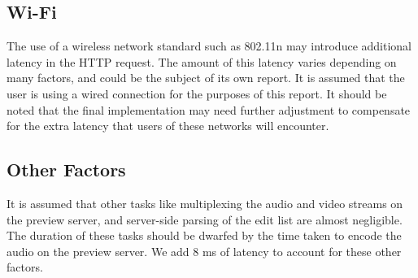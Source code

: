 \documentclass[se,resubmit]{uw-wkrpt}
\begin{document}
\begin{appendices}
\subsection{Wi-Fi}
The use of a wireless network standard such as 802.11n may introduce additional
latency in the HTTP request. The amount of this latency varies depending on many
factors, and could be the subject of its own report. It is assumed that the user
is using a wired connection for the purposes of this report. It should be noted
that the final implementation may need further adjustment to compensate for the
extra latency that users of these networks will encounter.

\subsection{Other Factors}
It is assumed that other tasks like multiplexing the audio and video streams on
the preview server, and server-side parsing of the edit list are almost
negligible. The duration of these tasks should be dwarfed by the time taken to
encode the audio on the preview server. We add 8 ms of latency to account for
these other factors.

\end{appendices}
\end{document}
